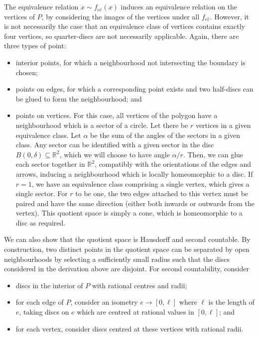\documentclass[a4paper]{article}
\begin{document}
The equivalence relation \( x \sim f_{e \hat e}(x) \) induces an equivalence relation on the vertices of \( P \), by considering the images of the vertices under all \( f_{e\hat e} \).
However, it is not necessarily the case that an equivalence class of vertices contains exactly four vertices, so quarter-discs are not necessarily applicable.
Again, there are three types of point:
\begin{itemize}
	\item interior points, for which a neighbourhood not intersecting the boundary is chosen;
	\item points on edges, for which a corresponding point exists and two half-discs can be glued to form the neighbourhood; and
	\item points on vertices.
		  For this case, all vertices of the polygon have a neighbourhood which is a sector of a circle.
		  Let there be \( r \) vertices in a given equivalence class.
		  Let \( \alpha \) be the sum of the angles of the sectors in a given class.
		  Any sector can be identified with a given sector in the disc \( B(0,\delta) \subseteq \mathbb R^2 \), which we will choose to have angle \( \alpha / r \).
		  Then, we can glue each sector together in \( \mathbb R^2 \), compatibly with the orientations of the edges and arrows, inducing a neighbourhood which is locally homeomorphic to a disc.
		  If \( r = 1 \), we have an equivalence class comprising a single vertex, which gives a single sector.
		  For \( r \) to be one, the two edges attached to this vertex must be paired and have the same direction (either both inwards or outwards from the vertex).
		  This quotient space is simply a cone, which is homeomorphic to a disc as required.
\end{itemize}
We can also show that the quotient space is Hausdorff and second countable.
By construction, two distinct points in the quotient space can be separated by open neighbourhoods by selecting a sufficiently small radius such that the discs considered in the derivation above are disjoint.
For second countability, consider
\begin{itemize}
	\item discs in the interior of \( P \) with rational centres and radii;
	\item for each edge of \( P \), consider an isometry \( e \to [0, \ell] \) where \( \ell \) is the length of \( e \), taking discs on \( e \) which are centred at rational values in \( [0,\ell] \); and
	\item for each vertex, consider discs centred at these vertices with rational radii.
\end{itemize}
\end{document}
